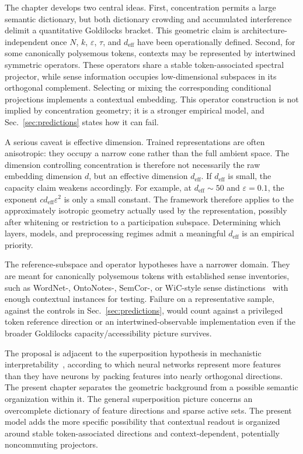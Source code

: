 \documentclass[
  aps,
  reprint,
  superscriptaddress,
  floatfix,
  nofootinbib,
  longbibliography
]{revtex4-2}
\newcommand{\deff}{d_{\mathrm{eff}}}
\begin{document}
The chapter develops two central ideas.  First, concentration permits a large
semantic dictionary, but both dictionary crowding and accumulated
interference delimit a quantitative Goldilocks bracket.  This geometric claim
is architecture-independent once $N$, $k$, $\varepsilon$, $\tau$, and
$\deff$ have been operationally defined.  Second, for some canonically
polysemous tokens, contexts may be represented by intertwined symmetric
operators.  These operators share a stable token-associated spectral
projector, while sense information occupies low-dimensional subspaces in its
orthogonal complement.  Selecting or mixing the corresponding conditional
projections implements a contextual embedding.  This operator construction
is not implied by concentration geometry; it is a stronger empirical model,
and Sec.~\ref{sec:predictions} states how it can fail.

A serious caveat is effective dimension. Trained representations are
often anisotropic: they occupy a narrow cone rather than the full
ambient space. The dimension controlling concentration is therefore
not necessarily the raw embedding dimension $d$, but an effective
dimension $\deff$. If $\deff$ is small, the capacity claim weakens
accordingly. For example, at $\deff\sim 50$ and $\varepsilon=0.1$, the
exponent $c\deff\varepsilon^{2}$ is only a small constant. The framework
therefore applies to the approximately isotropic geometry actually used
by the representation, possibly after whitening or restriction to a
participation subspace. Determining which layers, models, and
preprocessing regimes admit a meaningful $\deff$ is an empirical
priority.

The reference-subspace and operator hypotheses have a narrower domain. They
are meant for
canonically polysemous tokens with established sense inventories, such
as WordNet-, OntoNotes-, SemCor-, or WiC-style sense
distinctions~\cite{pilehvar2019wic} with enough contextual instances
for testing. Failure on a representative sample, against the controls in
Sec.~\ref{sec:predictions}, would count against a privileged token reference
direction or an intertwined-observable implementation even if the broader
Goldilocks capacity/accessibility picture survives.

The proposal is adjacent to the superposition hypothesis in mechanistic
interpretability~\cite{elhage2022superposition}, according to which neural networks
represent more features than they have neurons by packing features into
nearly orthogonal directions. The present chapter separates the
geometric background from a possible semantic organization within it.
The general superposition picture concerns an overcomplete dictionary
of feature directions and sparse active sets. The present model adds the more
specific possibility that contextual readout is organized around stable
token-associated directions and context-dependent, potentially noncommuting
projectors.
\end{document}
